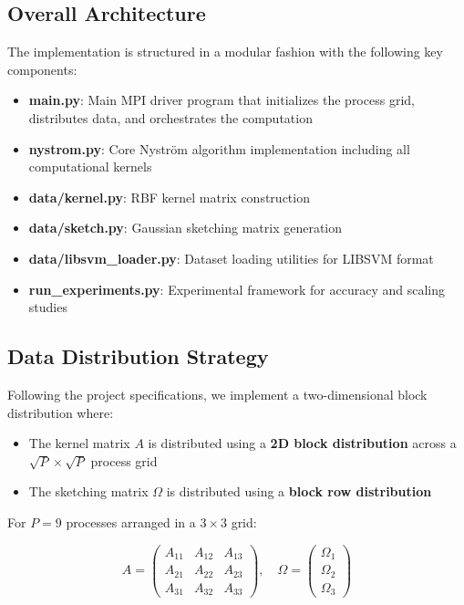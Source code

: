 \documentclass[11pt,a4paper]{article}
\begin{document}
\subsection{Overall Architecture}

The implementation is structured in a modular fashion with the following key components:

\begin{itemize}
    \item \textbf{main.py}: Main MPI driver program that initializes the process grid, distributes data, and orchestrates the computation
    \item \textbf{nystrom.py}: Core Nyström algorithm implementation including all computational kernels
    \item \textbf{data/kernel.py}: RBF kernel matrix construction
    \item \textbf{data/sketch.py}: Gaussian sketching matrix generation
    \item \textbf{data/libsvm\_loader.py}: Dataset loading utilities for LIBSVM format
    \item \textbf{run\_experiments.py}: Experimental framework for accuracy and scaling studies
\end{itemize}

\subsection{Data Distribution Strategy}

Following the project specifications, we implement a two-dimensional block distribution where:

\begin{itemize}
    \item The kernel matrix $A$ is distributed using a \textbf{2D block distribution} across a $\sqrt{P} \times \sqrt{P}$ process grid
    \item The sketching matrix $\Omega$ is distributed using a \textbf{block row distribution}
\end{itemize}

For $P = 9$ processes arranged in a $3 \times 3$ grid:

\begin{equation*}
A = \begin{pmatrix}
A_{11} & A_{12} & A_{13} \\
A_{21} & A_{22} & A_{23} \\
A_{31} & A_{32} & A_{33}
\end{pmatrix}, \quad
\Omega = \begin{pmatrix}
\Omega_1 \\
\Omega_2 \\
\Omega_3
\end{pmatrix}
\end{equation*}
\end{document}
